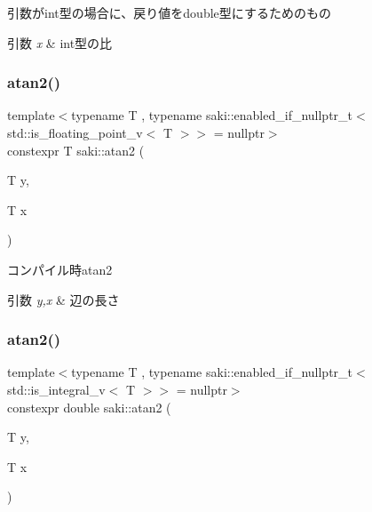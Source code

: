 引数がint型の場合に、戻り値をdouble型にするためのもの 


\begin{DoxyParams}{引数}
{\em x} & int型の比 \\
\hline
\end{DoxyParams}
\mbox{\label{namespacesaki_ac528a4ab6013623bfe6257229e302015}} 
\subsubsection{\texorpdfstring{atan2()}{atan2()}\hspace{0.1cm}{\footnotesize\ttfamily [1/3]}}
{\footnotesize\ttfamily template$<$typename T , typename saki\+::enabled\+\_\+if\+\_\+nullptr\+\_\+t$<$ std\+::is\+\_\+floating\+\_\+point\+\_\+v$<$ T $>$$>$  = nullptr$>$ \\
constexpr T saki\+::atan2 (\begin{DoxyParamCaption}\item[{T}]{y,  }\item[{T}]{x }\end{DoxyParamCaption})}



コンパイル時atan2 


\begin{DoxyParams}{引数}
{\em y,x} & 辺の長さ \\
\hline
\end{DoxyParams}
\mbox{\label{namespacesaki_a1f8c6dc6223b790f6d227c8d22cf8b86}} 
\subsubsection{\texorpdfstring{atan2()}{atan2()}\hspace{0.1cm}{\footnotesize\ttfamily [2/3]}}
{\footnotesize\ttfamily template$<$typename T , typename saki\+::enabled\+\_\+if\+\_\+nullptr\+\_\+t$<$ std\+::is\+\_\+integral\+\_\+v$<$ T $>$$>$  = nullptr$>$ \\
constexpr double saki\+::atan2 (\begin{DoxyParamCaption}\item[{T}]{y,  }\item[{T}]{x }\end{DoxyParamCaption})}



